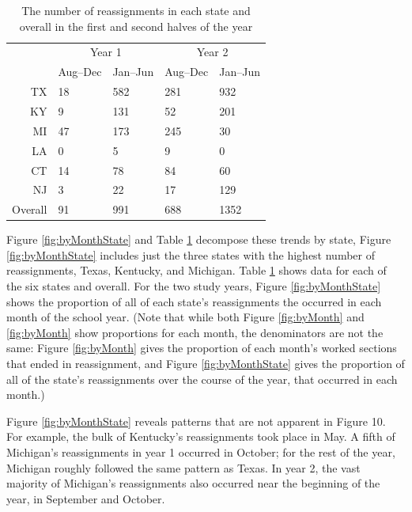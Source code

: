 \documentclass[12pt]{article}\usepackage[]{graphicx}\usepackage[]{color}
\begin{document}
\begin{table}
  \centering
  \begin{tabular}{rll|ll}
    &\multicolumn{2}{c}{Year 1}&\multicolumn{2}{c}{Year 2}\\
    &Aug--Dec&Jan--Jun&Aug--Dec&Jan--Jun\\
 TX &  18 & 582 & 281 & 932 \\ 
  KY &   9 & 131 &  52 & 201 \\ 
  MI &  47 & 173 & 245 &  30 \\ 
  LA &   0 &   5 &   9 &   0 \\ 
  CT &  14 &  78 &  84 &  60 \\ 
  NJ &   3 &  22 &  17 & 129 \\ 
   \hline
Overall &  91 & 991 & 688 & 1352 \\ 
  
\hline
\end{tabular}
\caption{The number of reassignments in each state and overall in the
  first and second halves of the year}
\label{tab:byMonth}
\end{table}

Figure \ref{fig:byMonthState} and Table \ref{tab:byMonth} decompose
these trends by state, Figure \ref{fig:byMonthState} includes just
the three states with the highest number of reassignments, Texas,
Kentucky, and Michigan. Table \ref{tab:byMonth} shows data for each of
the six states and overall.
For the two study years, Figure \ref{fig:byMonthState} shows the proportion of all of each
state's reassignments the occurred in each month of the school year.
(Note that while both Figure \ref{fig:byMonth} and \ref{fig:byMonth}
show proportions for each month, the denominators are not the same:
Figure \ref{fig:byMonth} gives the proportion of each month's worked
sections that ended in reassignment, and Figure \ref{fig:byMonthState}
gives the proportion of all of the state's reassignments over the
course of the year, that occurred in each month.)

Figure \ref{fig:byMonthState} reveals patterns that are not apparent
in Figure 10.
For example, the bulk of Kentucky's reassignments took place in May.
A fifth of Michigan's reassignments in year 1 occurred in October;
for the rest of the year, Michigan roughly followed the same pattern as Texas.
In year 2, the vast majority of Michigan's reassignments also occurred near
the beginning of the year, in September and October.
\end{document}
